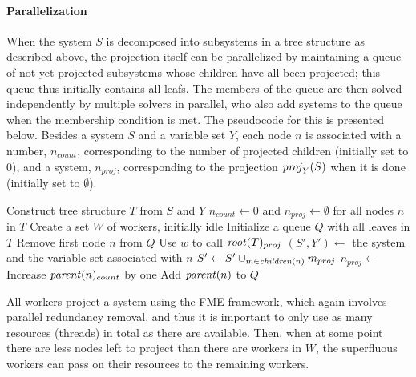 \paragraph{Parallelization}
When the system $S$ is decomposed into subsystems in a tree structure as described above, the projection itself can be parallelized by maintaining a queue of not yet projected subsystems whose children have all been projected; this queue thus initially contains all leafs. 
The members of the queue are then solved independently by multiple solvers in parallel, who also add systems to the queue when the membership condition is met.
The pseudocode for this is presented below. Besides a system $S$ and a variable set $Y$, each node $n$ is associated with a number, $n_{count}$, corresponding to the number of projected children (initially set to $0$), and a system, $n_{proj}$, corresponding to the projection $\mathit{proj}_Y(S)$ when it is done (initially set to $\emptyset$). 
\vspace{1mm}
\begin{algorithmic}
	\State Construct  tree structure $T$ from $S$ and $Y$
	\State $n_{count}\gets 0$ and $n_{proj}\gets\emptyset$ for all nodes $n$ in $T$
	\State Create a set $W$ of workers, initially idle
	\State Initialize a queue $Q$ with all leaves in $T$
			\State Remove first node $n$ from $Q$
			\State Use $w$ to call 
		\EndIf
	\EndWhile
	\State \Return $\mathit{root}(T)_{proj}$
\EndFunction
\Statex
{}
	\State $(S',Y')\gets$ the system and the variable set associated with $n$
	\State $S'\gets S'\cup_{m\in \mathit{children}(n)} m_{proj}$ 
	\State $n_{proj}\gets$ 
	\State Increase $\mathit{parent}(n)_{count}$ by one
		\State Add $\mathit{parent}(n)$ to $Q$
	\EndIf
	\State \Return
\EndFunction
\end{algorithmic}	
\vspace{1mm}
All workers project a system using the FME framework, which again involves parallel redundancy removal, and thus it is important to only use as many resources (threads) in total as there are available.
Then, when at some point there are less nodes left to project than there are workers in $W$, the superfluous workers can pass on their resources to the remaining workers.  
